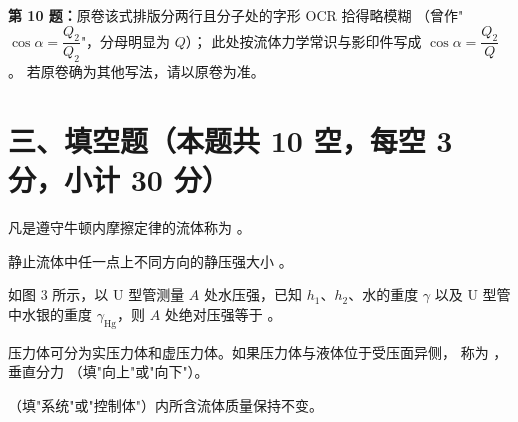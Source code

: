 \begin{tishi}
\textbf{第 10 题：}原卷该式排版分两行且分子处的字形 OCR 拾得略模糊
（曾作"\(\cos\alpha=\dfrac{Q_2}{Q_2}\)"，分母明显为 \(Q\)）；
此处按流体力学常识与影印件写成 \(\cos\alpha=\dfrac{Q_2}{Q}\)。
若原卷确为其他写法，请以原卷为准。
\end{tishi}

\section{三、填空题（本题共 10 空，每空 3 分，小计 30 分）}

\begin{ti}
  \item 凡是遵守牛顿内摩擦定律的流体称为 \underline{\hspace{3cm}}。\hfill{}

  \item 静止流体中任一点上不同方向的静压强大小 \underline{\hspace{3cm}}。\hfill{}

  \item 如图 3 所示，以 U 型管测量 \(A\) 处水压强，已知 \(h_1\)、\(h_2\)、水的重度 \(\gamma\)
  以及 U 型管中水银的重度 \(\gamma_{\mathrm{Hg}}\)，则 \(A\) 处绝对压强等于
  \underline{\hspace{3cm}}。
  \hfill{}

  \item 压力体可分为实压力体和虚压力体。如果压力体与液体位于受压面异侧，
  称为 \underline{\hspace{2.5cm}}，垂直分力 \underline{\hspace{2.5cm}}（填"向上"或"向下"）。
  \hfill{}

  \item \underline{\hspace{2.5cm}}（填"系统"或"控制体"）内所含流体质量保持不变。
  \hfill{}


\end{ti}
